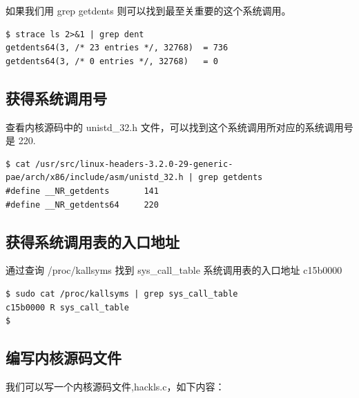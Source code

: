如果我们用 grep getdents 则可以找到最至关重要的这个系统调用。

{\begin{shaded}\begin{verbatim}
$ strace ls 2>&1 | grep dent
getdents64(3, /* 23 entries */, 32768)  = 736
getdents64(3, /* 0 entries */, 32768)   = 0
\end{verbatim}\end{shaded}}
\subsection{获得系统调用号}

查看内核源码中的 unistd\_32.h
文件，可以找到这个系统调用所对应的系统调用号是 220.

{\begin{shaded}\begin{verbatim}
$ cat /usr/src/linux-headers-3.2.0-29-generic-pae/arch/x86/include/asm/unistd_32.h | grep getdents 
#define __NR_getdents       141
#define __NR_getdents64     220
\end{verbatim}\end{shaded}}
\subsection{获得系统调用表的入口地址}

通过查询 /proc/kallsyms 找到 sys\_call\_table 系统调用表的入口地址
c15b0000

{\begin{shaded}\begin{verbatim}
$ sudo cat /proc/kallsyms | grep sys_call_table
c15b0000 R sys_call_table
$ 
\end{verbatim}\end{shaded}}
\subsection{编写内核源码文件}

我们可以写一个内核源码文件,hackls.c，如下内容：

